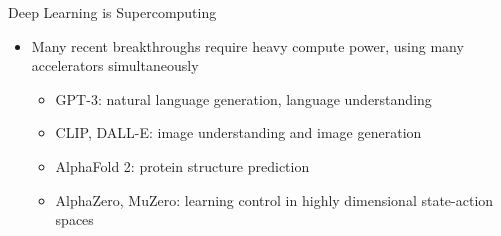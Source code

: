 \begin{frame}{Deep Learning is Supercomputing}
\protect\hypertarget{deep-learning-is-supercomputing-3}{}
\begin{itemize}
\tightlist
\item
  Many recent breakthroughs require heavy compute power, using many
  accelerators simultaneously

  \begin{itemize}
  \tightlist
  \item
    GPT-3: natural language generation, language understanding
  \item
    CLIP, DALL-E: image understanding and image generation\\
  \item
    AlphaFold 2: protein structure prediction
  \item
    AlphaZero, MuZero: learning control in highly dimensional
    state-action spaces
  \end{itemize}
\end{itemize}

\end{frame}

